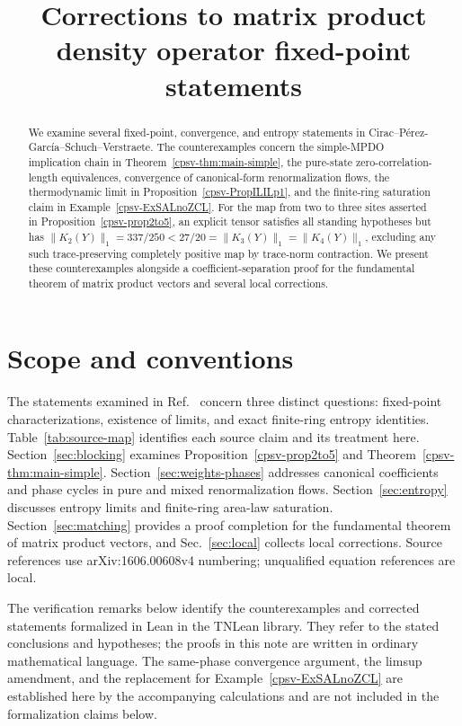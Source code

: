 \documentclass[aps,pra,reprint,nofootinbib,onecolumn]{revtex4-2}
\begin{document}
\title{Corrections to matrix product density operator fixed-point statements}
\begin{abstract}
	We examine several fixed-point, convergence, and entropy statements in
	Cirac--\allowbreak P\'erez-Garc\'ia--\allowbreak Schuch--\allowbreak Verstraete.
	The counterexamples concern the simple-MPDO implication chain in
	Theorem~\ref{cpsv-thm:main-simple}, the pure-state zero-correlation-length
	equivalences, convergence of canonical-form renormalization flows,
	the thermodynamic limit in Proposition~\ref{cpsv-PropILILp1}, and the
	finite-ring saturation claim in Example~\ref{cpsv-ExSALnoZCL}.
	For the map from two to three sites asserted in Proposition~\ref{cpsv-prop2to5},
	an explicit tensor satisfies all standing hypotheses but has
	$\|K_2(Y)\|_1=337/250<27/20=\|K_3(Y)\|_1=\|K_4(Y)\|_1$,
	excluding any such trace-preserving completely positive map by trace-norm contraction.
	We present these counterexamples alongside a coefficient-separation proof for
	the fundamental theorem of matrix product vectors and several local corrections.
\end{abstract}
\maketitle
{}

\section{Scope and conventions}\label{sec:scope}

The statements examined in Ref.~\cite{Cirac2017MPDO_AnnPhys} concern
three distinct questions: fixed-point characterizations, existence of
limits, and exact finite-ring entropy identities.
Table~\ref{tab:source-map} identifies each source claim and its treatment
here. Section~\ref{sec:blocking} examines Proposition~\ref{cpsv-prop2to5}
and Theorem~\ref{cpsv-thm:main-simple}. Section~\ref{sec:weights-phases}
addresses canonical coefficients and phase cycles in pure and mixed renormalization
flows. Section~\ref{sec:entropy} discusses entropy limits and finite-ring
area-law saturation. Section~\ref{sec:matching} provides a proof completion
for the fundamental theorem of matrix product vectors, and
Sec.~\ref{sec:local} collects local corrections.
Source references use arXiv:1606.00608v4 numbering;
unqualified equation references are local.

The verification remarks below identify the counterexamples and corrected
statements formalized in Lean in the TNLean library. They refer to the
stated conclusions and hypotheses; the proofs in this note are written in
ordinary mathematical language. The same-phase convergence argument,
the limsup amendment, and the replacement for Example~\ref{cpsv-ExSALnoZCL}
are established here by the accompanying calculations and are not included
in the formalization claims below.
\end{document}

